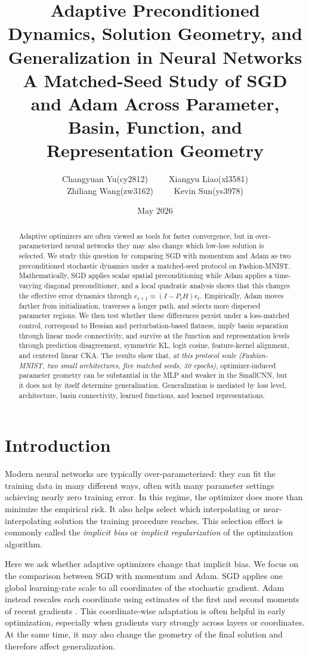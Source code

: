 \documentclass[11pt]{article}
\title{\textbf{Adaptive Preconditioned Dynamics, Solution Geometry, and Generalization in Neural Networks}\\
\Large A Matched-Seed Study of SGD and Adam Across Parameter, Basin, Function, and Representation Geometry}
\author{Changyuan Yu(cy2812)~~~~~Xiangyu Liao(xl3581)\\Zhiliang Wang(zw3162)~~~~~Kevin Sun(ys3978)}
\date{May 2026}
\begin{document}
\maketitle

\begin{abstract}
Adaptive optimizers are often viewed as tools for faster convergence, but in over-parameterized neural networks they may also change which low-loss solution is selected. We study this question by comparing SGD with momentum and Adam as two preconditioned stochastic dynamics under a matched-seed protocol on Fashion-MNIST. Mathematically, SGD applies scalar spatial preconditioning while Adam applies a time-varying diagonal preconditioner, and a local quadratic analysis shows that this changes the effective error dynamics through $e_{t+1}\approx (I-P_tH)e_t$. Empirically, Adam moves farther from initialization, traverses a longer path, and selects more dispersed parameter regions. We then test whether these differences persist under a loss-matched control, correspond to Hessian and perturbation-based flatness, imply basin separation through linear mode connectivity, and survive at the function and representation levels through prediction disagreement, symmetric KL, logit cosine, feature-kernel alignment, and centered linear CKA. The results show that, \emph{at this protocol scale (Fashion-MNIST, two small architectures, five matched seeds, 30 epochs)}, optimizer-induced parameter geometry can be substantial in the MLP and weaker in the SmallCNN, but it does not by itself determine generalization. Generalization is mediated by loss level, architecture, basin connectivity, learned functions, and learned representations.
\end{abstract}

\section{Introduction}

Modern neural networks are typically over-parameterized: they can fit the training data in many different ways, often with many parameter settings achieving nearly zero training error. In this regime, the optimizer does more than minimize the empirical risk. It also helps select which interpolating or near-interpolating solution the training procedure reaches. This selection effect is commonly called the \emph{implicit bias} or \emph{implicit regularization} of the optimization algorithm.

Here we ask whether adaptive optimizers change that implicit bias. We focus on the comparison between SGD with momentum and Adam. SGD applies one global learning-rate scale to all coordinates of the stochastic gradient. Adam instead rescales each coordinate using estimates of the first and second moments of recent gradients \cite{kingma2015adam}. This coordinate-wise adaptation is often helpful in early optimization, especially when gradients vary strongly across layers or coordinates. At the same time, it may also change the geometry of the final solution and therefore affect generalization.
\end{document}
